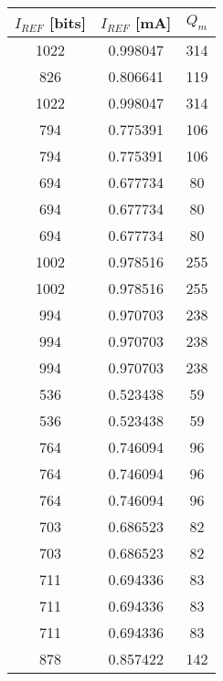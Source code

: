 \begin{tabular}{ccc}
\toprule
$I_{REF}$ [bits] & $I_{REF}$ [mA] & $Q_m$ \\
\midrule
            1022 &       0.998047 &   314 \\
             826 &       0.806641 &   119 \\
            1022 &       0.998047 &   314 \\
             794 &       0.775391 &   106 \\
             794 &       0.775391 &   106 \\
             694 &       0.677734 &    80 \\
             694 &       0.677734 &    80 \\
             694 &       0.677734 &    80 \\
            1002 &       0.978516 &   255 \\
            1002 &       0.978516 &   255 \\
             994 &       0.970703 &   238 \\
             994 &       0.970703 &   238 \\
             994 &       0.970703 &   238 \\
             536 &       0.523438 &    59 \\
             536 &       0.523438 &    59 \\
             764 &       0.746094 &    96 \\
             764 &       0.746094 &    96 \\
             764 &       0.746094 &    96 \\
             703 &       0.686523 &    82 \\
             703 &       0.686523 &    82 \\
             711 &       0.694336 &    83 \\
             711 &       0.694336 &    83 \\
             711 &       0.694336 &    83 \\
             878 &       0.857422 &   142 \\
\bottomrule
\end{tabular}
